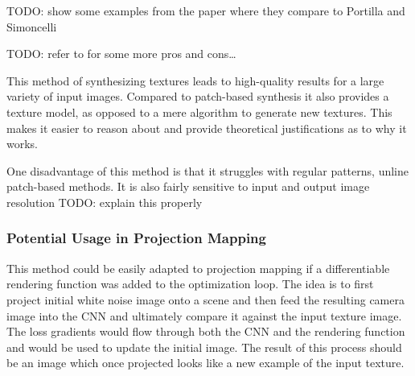 {\color{red} TODO: show some examples from the paper where they compare to Portilla and Simoncelli}

{\color{red} TODO: refer to \citet{Raad2018} for some more pros and cons\dots}

This method of synthesizing textures leads to high-quality results for a large variety of input images. Compared to patch-based synthesis it also provides a texture model, as opposed to a mere algorithm to generate new textures. This makes it easier to reason about and provide theoretical justifications as to why it works.

One disadvantage of this method is that it struggles with regular patterns, unline patch-based methods. It is also fairly sensitive to input and output image resolution {\color{red} TODO: explain this properly}

\subsubsection{Potential Usage in Projection Mapping}
\label{section:background-texture_synthesis-statistics_based-projection_mapping}

This method could be easily adapted to projection mapping if a differentiable rendering function was added to the optimization loop. The idea is to first project initial white noise image onto a scene and then feed the resulting camera image into the CNN and ultimately compare it against the input texture image. The loss gradients would flow through both the CNN and the rendering function and would be used to update the initial image. The result of this process should be an image which once projected looks like a new example of the input texture.